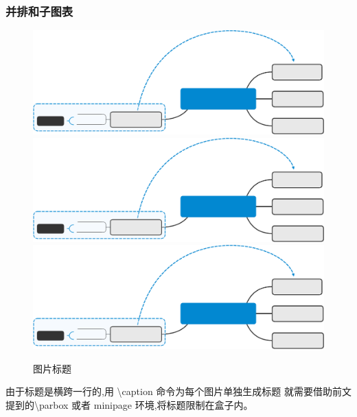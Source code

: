 \documentclass[a4paper]{ctexart}
\begin{document}
    \subsubsection{并排和子图表}
    \begin{figure}[htbp]
        \centering
        \includegraphics[scale=0.125]{Central_Topic.eps}
        \qquad
        \includegraphics[scale=0.125]{Central_Topic.eps}\\
        \includegraphics[scale=0.25]{Central_Topic.eps}
        \caption{图片标题}
        \label{}
    \end{figure}
    由于标题是横跨一行的,用 \textbackslash caption 命令为每个图片单独生成标题%
    就需要借助前文提到的\textbackslash parbox 或者 minipage 环境,将标题限制在盒子内。\par
\end{document}
